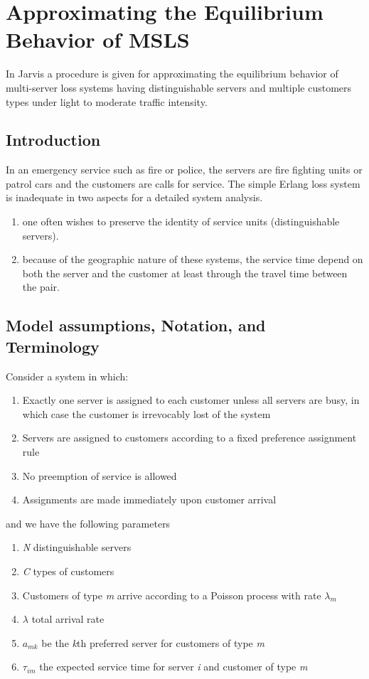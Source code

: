 
\section{Approximating the Equilibrium Behavior of MSLS}
In Jarvis \cite{jarvis1985approximating}
a procedure is given
for approximating the equilibrium behavior
of multi-server loss systems having distinguishable servers
and multiple customers types
under light to moderate traffic intensity.

\subsection{Introduction}
In an emergency service such as fire or police, 
the servers are fire fighting units or patrol cars
and the customers are calls for service.
The simple Erlang loss system
is inadequate in two aspects for a detailed system analysis.
\begin{enumerate}
\item one often wishes
  to preserve the identity of service units (distinguishable servers).
\item because
  of the geographic nature of these systems,
  the service time depend on both
  the server and the customer
  at least through the travel time between the pair.
\end{enumerate}

\subsection{Model assumptions, Notation, and Terminology}
Consider a system in which:
\begin{enumerate}
\item Exactly one server
  is assigned to each customer
  unless all servers are busy, 
  in which case
  the customer is irrevocably lost of the system
\item Servers are assigned
  to customers according to a fixed preference assignment rule
\item No preemption of service is allowed
\item Assignments are made immediately
  upon customer arrival
\end{enumerate}

and we have the following parameters
\begin{enumerate}
\item \textit{N} distinguishable servers
\item \textit{C} types of customers
\item Customers of type \textit{m}
  arrive according to a Poisson process with rate $\lambda_{m}$
\item $\lambda$ total arrival rate
\item $a_{mk}$ be the \textit{k}th preferred server
  for customers of type \textit{m}
\item $\tau_{im}$ the expected service time
  for server \textit{i} and customer of type \textit{m}
\end{enumerate}

